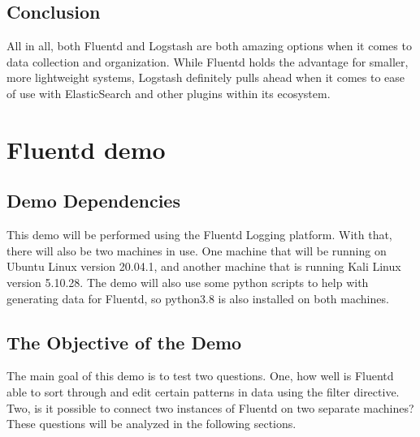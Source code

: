 \documentclass{article}
\begin{document}
\subsection{Conclusion}
\quad \quad
All in all, both Fluentd and Logstash are both amazing options when it comes to data collection and organization. While Fluentd holds the advantage for smaller, more lightweight systems, Logstash definitely pulls ahead when it comes to ease of 
use with ElasticSearch and other plugins within its ecosystem.
\section{Fluentd demo} \label{sec:demo}
\subsection{Demo Dependencies}
\quad \quad This demo will be performed using the Fluentd Logging platform. With that, there will also be two machines in use. One machine that will be running on Ubuntu Linux version 20.04.1, and another machine that is running Kali Linux version 5.10.28.
The demo will also use some python scripts to help with generating data for Fluentd, so python3.8 is also installed on both machines.
\subsection{The Objective of the Demo}
\quad \quad The main goal of this demo is to test two questions. One, how well is Fluentd able to sort through and edit certain patterns in data using the filter directive. Two, is it possible to connect two instances of 
Fluentd on two separate machines? These questions will be analyzed in the following sections.
\end{document}
